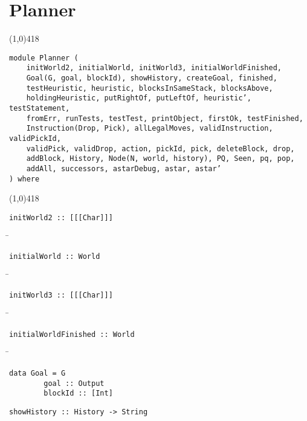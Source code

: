 \section{Planner}
\begin{center}
\line(1,0){418}
\end{center}
\begin{verbatim}
module Planner (
    initWorld2, initialWorld, initWorld3, initialWorldFinished,
    Goal(G, goal, blockId), showHistory, createGoal, finished,
    testHeuristic, heuristic, blocksInSameStack, blocksAbove,
    holdingHeuristic, putRightOf, putLeftOf, heuristic’, testStatement,
    fromErr, runTests, testTest, printObject, firstOk, testFinished,
    Instruction(Drop, Pick), allLegalMoves, validInstruction, validPickId,
    validPick, validDrop, action, pickId, pick, deleteBlock, drop,
    addBlock, History, Node(N, world, history), PQ, Seen, pq, pop,
    addAll, successors, astarDebug, astar, astar’
) where
\end{verbatim}
\begin{center}
\line(1,0){418}
\end{center}
\begin{verbatim}
initWorld2 :: [[[Char]]]
\end{verbatim}
\begin{tabbing}
\hspace*{1cm}\= \kill
\> 
\end{tabbing}
\begin{verbatim}
initialWorld :: World
\end{verbatim}
\begin{tabbing}
\hspace*{1cm}\= \kill
\> 
\end{tabbing}
\begin{verbatim}
initWorld3 :: [[[Char]]]
\end{verbatim}
\begin{tabbing}
\hspace*{1cm}\= \kill
\> 
\end{tabbing}
\begin{verbatim}
initialWorldFinished :: World
\end{verbatim}
\begin{tabbing}
\hspace*{1cm}\= \kill
\> 
\end{tabbing}
\begin{verbatim}
data Goal = G
        goal :: Output
        blockId :: [Int]
\end{verbatim}
\begin{verbatim}
showHistory :: History -> String
\end{verbatim}
